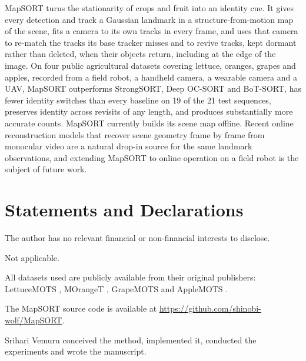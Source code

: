 \documentclass[pdflatex,sn-basic]{sn-jnl}%
\theoremstyle{thmstyleone}%
\begin{document}
MapSORT turns the stationarity of crops and fruit into an identity cue. It gives every detection and track a Gaussian landmark in a structure-from-motion map of the scene, fits a camera to its own tracks in every frame, and uses that camera to re-match the tracks its base tracker misses and to revive tracks, kept dormant rather than deleted, when their objects return, including at the edge of the image. On four public agricultural datasets covering lettuce, oranges, grapes and apples, recorded from a field robot, a handheld camera, a wearable camera and a UAV, MapSORT outperforms StrongSORT, Deep OC-SORT and BoT-SORT, has fewer identity switches than every baseline on 19 of the 21 test sequences, preserves identity across revisits of any length, and produces substantially more accurate counts. MapSORT currently builds its scene map offline. Recent online reconstruction models that recover scene geometry frame by frame from monocular video \citep{wang2025cut3r,murai2025mast3rslam} are a natural drop-in source for the same landmark observations, and extending MapSORT to online operation on a field robot is the subject of future work.

\backmatter

\section*{Statements and Declarations}

The author has no relevant financial or non-financial interests to disclose.

Not applicable.

All datasets used are publicly available from their original publishers: LettuceMOTS \citep{hu2024lettucemots}, MOrangeT \citep{santos2024moranget}, GrapeMOTS \citep{arizasentis2024grapemots} and AppleMOTS \citep{dejong2022applemots}.

The MapSORT source code is available at \url{https://github.com/shinobi-wolf/MapSORT}. %

Srihari Vemuru conceived the method, implemented it, conducted the experiments and wrote the manuscript.

\end{document}
